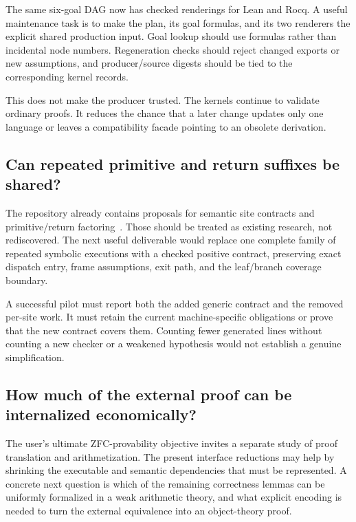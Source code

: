 \documentclass[11pt]{article}
\begin{document}
The same six-goal DAG now has checked renderings for Lean and Rocq. A useful maintenance task is to make the plan, its goal formulas, and its two renderers the explicit shared production input. Goal lookup should use formulas rather than incidental node numbers. Regeneration checks should reject changed exports or new assumptions, and producer/source digests should be tied to the corresponding kernel records.

This does not make the producer trusted. The kernels continue to validate ordinary proofs. It reduces the chance that a later change updates only one language or leaves a compatibility facade pointing to an obsolete derivation.

\subsection{Can repeated primitive and return suffixes be shared?}

The repository already contains proposals for semantic site contracts and primitive/return factoring~\cite{sharedprior,phase12}. Those should be treated as existing research, not rediscovered. The next useful deliverable would replace one complete family of repeated symbolic executions with a checked positive contract, preserving exact dispatch entry, frame assumptions, exit path, and the leaf/branch coverage boundary.

A successful pilot must report both the added generic contract and the removed per-site work. It must retain the current machine-specific obligations or prove that the new contract covers them. Counting fewer generated lines without counting a new checker or a weakened hypothesis would not establish a genuine simplification.

\subsection{How much of the external proof can be internalized economically?}

The user's ultimate ZFC-provability objective invites a separate study of proof translation and arithmetization. The present interface reductions may help by shrinking the executable and semantic dependencies that must be represented. A concrete next question is which of the remaining correctness lemmas can be uniformly formalized in a weak arithmetic theory, and what explicit encoding is needed to turn the external equivalence into an object-theory proof.
\end{document}
